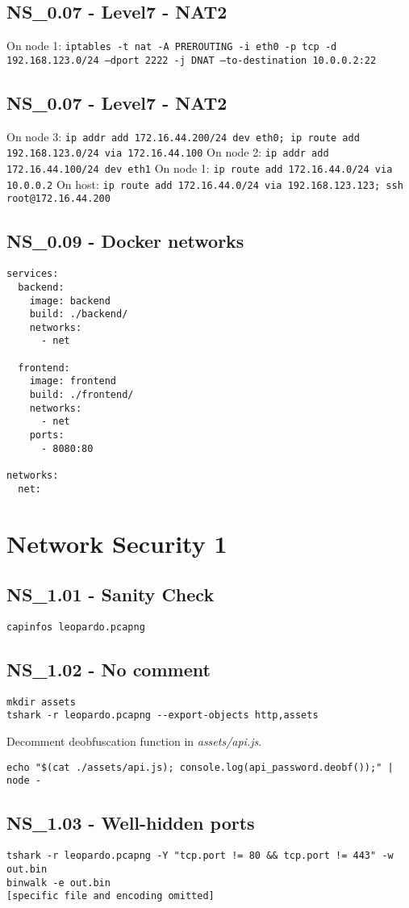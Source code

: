 \subsection{NS_0.07 - Level7 - NAT2}
On node 1: \texttt{iptables -t nat -A PREROUTING -i eth0 -p tcp -d 192.168.123.0/24 --dport 2222 -j DNAT --to-destination 10.0.0.2:22}

\subsection{NS_0.07 - Level7 - NAT2}
On node 3: \texttt{ip addr add 172.16.44.200/24 dev eth0; ip route add 192.168.123.0/24 via 172.16.44.100}
On node 2: \texttt{ip addr add 172.16.44.100/24 dev eth1}
On node 1: \texttt{ip route add 172.16.44.0/24 via 10.0.0.2}
On host: \texttt{ip route add 172.16.44.0/24 via 192.168.123.123; ssh root@172.16.44.200}

\subsection{NS_0.09 - Docker networks}
\begin{verbatim}
services:
  backend:
    image: backend
    build: ./backend/
    networks:
      - net

  frontend:
    image: frontend
    build: ./frontend/
    networks:
      - net
    ports:
      - 8080:80

networks:
  net:
\end{verbatim}

\section{Network Security 1}
\subsection{NS_1.01 - Sanity Check}
\texttt{capinfos leopardo.pcapng}

\subsection{NS_1.02 - No comment}
\begin{verbatim}
mkdir assets
tshark -r leopardo.pcapng --export-objects http,assets
\end{verbatim}

Decomment deobfuscation function in \textit{assets/api.js}. 

\texttt{echo "\$(cat ./assets/api.js); console.log(api_password.deobf());" | node -}

\subsection{NS_1.03 - Well-hidden ports}
\begin{verbatim}
tshark -r leopardo.pcapng -Y "tcp.port != 80 && tcp.port != 443" -w out.bin
binwalk -e out.bin
[specific file and encoding omitted]
\end{verbatim}